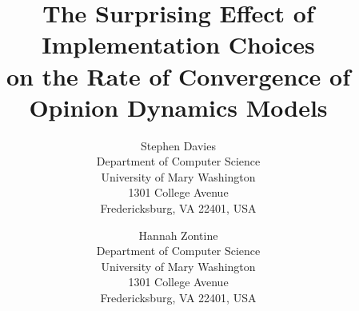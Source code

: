 \documentclass{wscpaperproc}
\begin{document}

\title{The Surprising Effect of Implementation Choices\\ on the Rate of
Convergence of Opinion Dynamics Models}

\author{Stephen Davies\\ [12pt]
Department of Computer Science \\
University of Mary Washington\\
1301 College Avenue \\
Fredericksburg, VA 22401, USA
\and
Hannah Zontine \\[12pt]
Department of Computer Science \\
University of Mary Washington\\
1301 College Avenue \\
Fredericksburg, VA 22401, USA
}

\maketitle











\appendix

\vspace{6pt}



\end{document}
